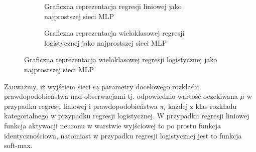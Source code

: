 \documentclass{myclass}
\begin{document}
\begin{figure}[ht]
    \centering
    \begin{subfigure}[b]{0.8\textwidth}
        \centering
        \caption{Graficzna reprezentacja regresji liniowej jako najprostszej sieci MLP}
        \label{fig:simple-mlp1}
    \end{subfigure}
    \hfil
    \begin{subfigure}[b]{0.8\textwidth}
        \centering
        \caption{Graficzna reprezentacja wieloklasowej regresji logistycznej jako najprostszej sieci MLP}
        \label{fig:simple-mlp2}
    \end{subfigure}
    
\end{figure}

Zauważmy, iż wyjściem sieci są parametry docelowego rozkładu prawdopodobieństwa nad obserwacjami tj.
odpowiednio wartość oczekiwana \(\mu\) w przypadku regresji liniowej i prawdopodobieństwa \(\pi_i\)
każdej z klas rozkładu kategorialnego w przypadku regresji logistycznej. W przypadku regresji
liniowej funkcja aktywacji neuronu w warstwie wyjściowej to po prostu funkcja identycznościowa,
natomiast w przypadku regresji logistycznej jest to funkcja soft-max.
\end{document}
